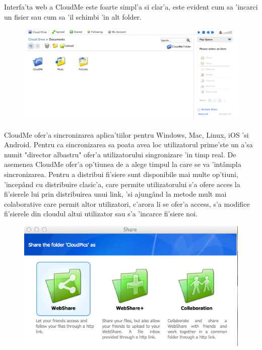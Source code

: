 \documentclass[12pt,a4paper,twoside]{report}
\begin{document}
Interfa'ta web a CloudMe este foarte simpl'a si clar'a, este evident cum sa 'incarci un fisier sau cum sa 'il schimbi 'in alt folder.
\begin{figure}[H]
\begin{center}
\advance\leftskip-3cm
\advance\rightskip-3cm
\includegraphics[keepaspectratio=true,scale=0.4]{img/Web-interface_CloudME.png}
\caption{}
\label{web_cloudMe}
\end{center}
\end{figure}

CloudMe ofer'a sincronizarea aplica'tiilor pentru Windows, Mac, Linux, iOS 'si Android. Pentru ca sincronizarea sa poata avea loc utilizatorul prime'ste un a'sa numit "director albastru" ofer'a utilizatorului singronizare 'in timp real. De asemenea CloudMe ofer'a op'tiunea de a alege timpul la care se va 'intâmpla sincronizarea.
Pentru a distribui fi'siere sunt disponibile mai multe op'tiuni, 'incepând cu distribuire clasic'a, care permite utilizatorului s'a ofere acces la fi'sierele lui prin distribuirea unui link, 'si ajungând la metode mult mai colaborative care permit altor utilizatori, c'arora li se ofer'a access, s'a modifice fi'sierele din cloudul altui utilizator sau s'a 'incarce fi'siere noi.

\begin{figure}[H]
\begin{center}
\advance\leftskip-3cm
\advance\rightskip-3cm
\includegraphics[keepaspectratio=true,scale=0.4]{img/Share-options_CloudME.png}
\caption{}
\label{web_cloudMe}
\end{center}
\end{figure}
\end{document}

